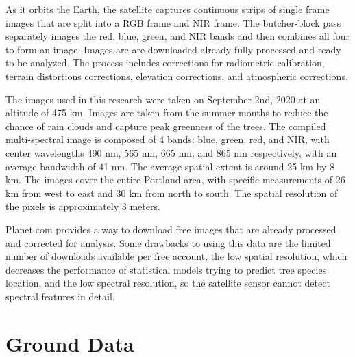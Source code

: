\documentclass[12pt,twoside]{reedthesis}
\begin{document}
As it orbits the Earth, the satellite captures continuous strips of single frame images that are split into a RGB frame and NIR frame. The butcher-block pass separately images the red, blue, green, and NIR bands and then combines all four to form an image. Images are are downloaded already fully processed and ready to be analyzed. The process includes corrections for radiometric calibration, terrain distortions corrections, elevation corrections, and atmospheric corrections.

The images used in this research were taken on September 2nd, 2020 at an altitude of 475 km. Images are taken from the summer months to reduce the chance of rain clouds and capture peak greenness of the trees. The compiled multi-spectral image is composed of 4 bands: blue, green, red, and NIR, with center wavelengths 490 nm, 565 nm, 665 nm, and 865 nm respectively, with an average bandwidth of 41 nm. The average spatial extent is around 25 km by 8 km. The images cover the entire Portland area, with specific measurements of 26 km from west to east and 30 km from north to south. The spatial resolution of the pixels is approximately 3 meters.

Planet.com provides a way to download free images that are already processed and corrected for analysis. Some drawbacks to using this data are the limited number of downloads available per free account, the low spatial resolution, which decreases the performance of statistical models trying to predict tree species location, and the low spectral resolution, so the satellite sensor cannot detect spectral features in detail.

\hypertarget{ground-data}{%
\section{Ground Data}\label{ground-data}}
\end{document}
